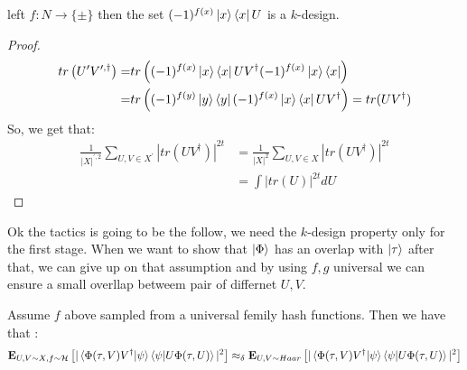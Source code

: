 \documentclass[manuscript,screen,review]{acmart}
\begin{document}
\begin{claim}
  left $f : N \rightarrow \{ \pm \}$ then the set $ (-1)^{f(x)}\ket{x}\bra{x}U$ is a $k$-design. 
\end{claim}
\begin{proof}
  \begin{equation*}
    \begin{split}
      tr\left( U^{\prime}V^{\prime,\dagger} \right)  = & tr\left( (-1)^{f(x)}\ket{x}\bra{x}UV^{\dagger} (-1)^{f(x)}\ket{x}\bra{x} \right) \\ 
  = & tr\left( (-1)^{f(y)}\ket{y}\bra{y}(-1)^{f(x)}\ket{x}\bra{x}UV^{\dagger} \right) = tr(UV^{\dagger})  
    \end{split}
  \end{equation*}
  So, we get that:
  \begin{equation*}
    \begin{split}
      \frac{1}{|X|^{\prime, 2}}\sum_{U,V\in X^{\prime}}{ |tr(UV^{\dagger} )|^{2t} } & =  \frac{1}{|X|^{2}}\sum_{U,V\in X}{ |tr(UV^{\dagger} )|^{2t} }\\
      & = \int{ |tr(U)|^{2t} dU} 
    \end{split}
  \end{equation*}
\end{proof}

Ok the tactics is going to be the follow, we need the $k$-design property only for the first stage.  When we want to show that $\ket{\Phi}$ has an overlap with $\ket{\tau}$ after that, we can give up on that assumption and by using $f,g$ universal we can ensure a small overllap betweem pair of differnet $U,V$. 

\begin{claim}
  Assume $f$ above sampled from a universal femily hash functions. Then we have that :  
  \begin{equation*}
    \begin{split}
    \exppm{ |\braket{\Phi(\tau,V) V^{\dagger}|\psi}\braket{\psi|U\Phi(\tau,U)}|^{2} }{U,V \sim X , f\sim \mathcal{H}} \approx_{\delta} \exppm{ |\braket{\Phi(\tau,V) V^{\dagger}|\psi}\braket{\psi|U\Phi(\tau,U)}|^{2} }{U,V \sim Haar }
    \end{split}
  \end{equation*}
\end{claim}
\end{document}
